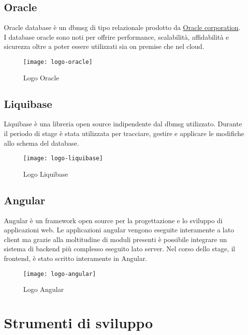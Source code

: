 \subsection{Oracle}
Oracle database è un \gls{dbmsg} di tipo relazionale prodotto da \href{https://www.oracle.com/}{Oracle corporation}. 
\\I database oracle sono noti per offrire performance, scalabilità, affidabilità e sicurezza oltre a poter essere utilizzati sia on premise che nel cloud.
\begin{figure}[h]
    \begin{center}
    \texttt{[image: logo-oracle]}
    \caption{Logo Oracle}
    \label{fig:figure7}
    \end{center}
\end{figure}

\subsection{Liquibase}
Liquibase è una libreria open source indipendente dal \gls{dbmsg} utilizzato. Durante il periodo di stage è stata utilizzata per tracciare, gestire e applicare le modifiche allo schema del database.
\begin{figure}[h]
    \begin{center}
    \texttt{[image: logo-liquibase]}
    \caption{Logo Liquibase}
    \label{fig:figure8}
    \end{center}
\end{figure}
\subsection{Angular}
Angular è un framework open source per la progettazione e lo sviluppo di applicazioni web.
Le applicazioni angular vengono eseguite interamente a lato client ma grazie alla moltitudine di moduli presenti è possibile integrare un sistema di backend più complesso eseguito lato server.
Nel corso dello stage, il frontend, è stato scritto interamente in Angular.
\begin{figure}[h]
    \begin{center}
    \texttt{[image: logo-angular]}
    \caption{Logo Angular}
    \label{fig:figure9}
    \end{center}
\end{figure}

\newpage
\section{Strumenti di sviluppo}

